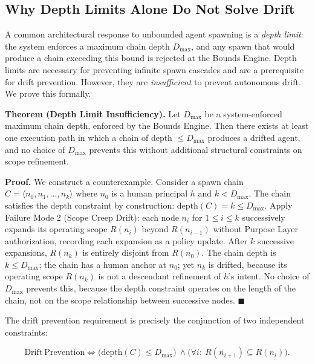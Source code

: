 \subsection{Why Depth Limits Alone Do Not Solve Drift}
\label{sec:drift-depth-limits}

A common architectural response to unbounded agent spawning is a \emph{depth limit}: the system enforces a maximum chain depth $D_{\max}$, and any spawn that would produce a chain exceeding this bound is rejected at the Bounds Engine. Depth limits are necessary for preventing infinite spawn cascades and are a prerequisite for drift prevention. However, they are \emph{insufficient} to prevent autonomous drift. We prove this formally.

\medskip
\noindent\textbf{Theorem (Depth Limit Insufficiency).}
Let $D_{\max}$ be a system-enforced maximum chain depth, enforced by the Bounds Engine. Then there exists at least one execution path in which a chain of depth $\leq D_{\max}$ produces a drifted agent, and no choice of $D_{\max}$ prevents this without additional structural constraints on scope refinement.

\medskip
\noindent\textbf{Proof.} We construct a counterexample. Consider a spawn chain $C = \langle n_0, n_1, \ldots, n_k \rangle$ where $n_0$ is a human principal $h$ and $k < D_{\max}$. The chain satisfies the depth constraint by construction: $\mathrm{depth}(C) = k \leq D_{\max}$. Apply Failure Mode 2 (Scope Creep Drift): each node $n_i$ for $1 \leq i \leq k$ successively expands its operating scope $R(n_i)$ beyond $R(n_{i-1})$ without Purpose Layer authorization, recording each expansion as a policy update. After $k$ successive expansions, $R(n_k)$ is entirely disjoint from $R(n_0)$. The chain depth is $k \leq D_{\max}$; the chain has a human anchor at $n_0$; yet $n_k$ is drifted, because its operating scope $R(n_k)$ is not a descendant refinement of $h$'s intent. No choice of $D_{\max}$ prevents this, because the depth constraint operates on the length of the chain, not on the scope relationship between successive nodes. $\blacksquare$

\bigskip
The drift prevention requirement is precisely the conjunction of two independent constraints:

\begin{equation}
\mathrm{Drift\ Prevention} \iff \bigl( \mathrm{depth}(C) \leq D_{\max} \bigr)\ \land \bigl( \forall i:\ R(n_{i+1}) \subseteq R(n_i) \bigr).
\label{eq:drift-prevention-constraint}
\end{equation}


